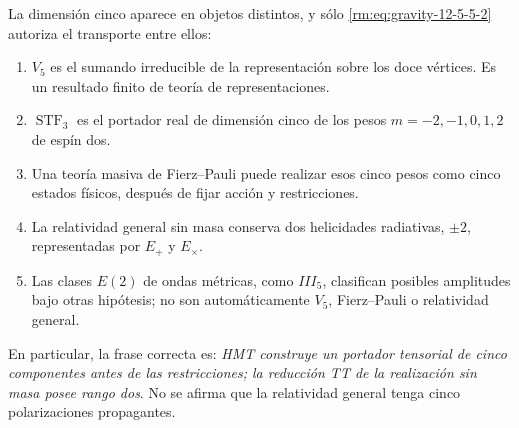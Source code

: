 La dimensi\'on cinco aparece en objetos distintos, y s\'olo
\cref{rm:eq:gravity-12-5-5-2} autoriza el transporte entre ellos:

\begin{enumerate}
\item \(V_5\) es el sumando irreducible de la representaci\'on sobre los
doce v\'ertices. Es un resultado finito de teor\'ia de representaciones.
\item \(\operatorname{STF}_3\) es el portador real de dimensi\'on cinco de
los pesos \(m=-2,-1,0,1,2\) de esp\'in dos.
\item Una teor\'ia masiva de Fierz--Pauli puede realizar esos cinco pesos
como cinco estados f\'isicos, despu\'es de fijar acci\'on y restricciones.
\item La relatividad general sin masa conserva dos helicidades radiativas,
\(\pm2\), representadas por \(E_+\) y \(E_\times\).
\item Las clases \(E(2)\) de ondas m\'etricas, como \(III_5\), clasifican
posibles amplitudes bajo otras hip\'otesis; no son autom\'aticamente
\(V_5\), Fierz--Pauli o relatividad general.
\end{enumerate}

En particular, la frase correcta es: \emph{HMT construye un portador
tensorial de cinco componentes antes de las restricciones; la reducci\'on
TT de la realizaci\'on sin masa posee rango dos}. No se afirma que la
relatividad general tenga cinco polarizaciones propagantes.
